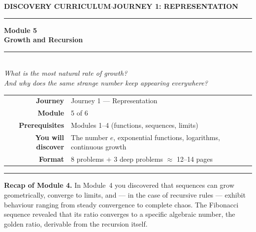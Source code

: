 \documentclass[12pt, a4paper]{article}
\newcounter{problem}
\begin{document}

\thispagestyle{empty}
\begin{center}
{\small\color{MidBlue}\textbf{DISCOVERY CURRICULUM}\quad$\cdot$\quad\textbf{JOURNEY 1: REPRESENTATION}}

\vspace{0.6cm}
{\color{NavyBlue}\rule{\linewidth}{2pt}}
\vspace{0.5cm}

{\Huge\bfseries\color{NavyBlue}Module 5}\\[0.3cm]
{\LARGE\bfseries\color{MidBlue}Growth and Recursion}\\[0.4cm]
{\color{Gold}\rule{0.4\linewidth}{1.2pt}}\\[0.4cm]
{\large\itshape\color{DarkGrey}
What is the most natural rate of growth?\\[0.15cm]
And why does the same strange number keep appearing everywhere?}

\vspace{1cm}
\begin{tabular}{rl}
\color{DarkGrey}\textbf{Journey}           & Journey 1 --- Representation \\[4pt]
\color{DarkGrey}\textbf{Module}            & 5 of 6 \\[4pt]
\color{DarkGrey}\textbf{Prerequisites}     & Modules 1--4 (functions, sequences, limits) \\[4pt]
\color{DarkGrey}\textbf{You will discover} & The number $e$, exponential functions, logarithms, continuous growth \\[4pt]
\color{DarkGrey}\textbf{Format}            & 8 problems $+$ 3 deep problems $\approx$ 12--14 pages \\
\end{tabular}

\vspace{1cm}
{\color{NavyBlue}\rule{\linewidth}{2pt}}
\end{center}

\vspace{0.6cm}

\noindent\textbf{Recap of Module 4.}
In Module~4 you discovered that sequences can grow geometrically, converge to limits, and --- in the case of recursive rules --- exhibit behaviour ranging from steady convergence to complete chaos. The Fibonacci sequence revealed that its ratio converges to a specific algebraic number, the golden ratio, derivable from the recursion itself.
\end{document}
